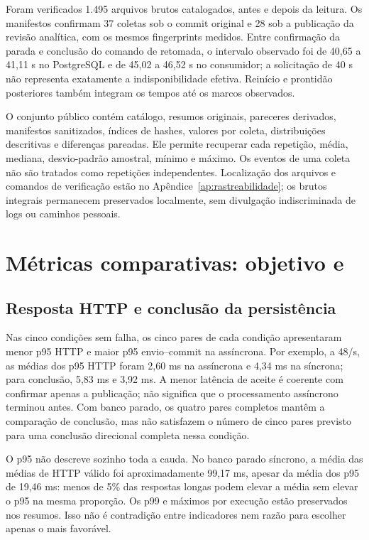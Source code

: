 Foram verificados 1.495 arquivos brutos catalogados, antes e depois da leitura. Os manifestos confirmam 37 coletas sob o commit original e 28 sob a publicação da revisão analítica, com os mesmos fingerprints medidos. Entre confirmação da parada e conclusão do comando de retomada, o intervalo observado foi de 40,65 a 41,11 s no PostgreSQL e de 45,02 a 46,52 s no consumidor; a solicitação de 40 s não representa exatamente a indisponibilidade efetiva. Reinício e prontidão posteriores também integram os tempos até os marcos observados.

O conjunto público contém catálogo, resumos originais, pareceres derivados, manifestos sanitizados, índices de hashes, valores por coleta, distribuições descritivas e diferenças pareadas. Ele permite recuperar cada repetição, média, mediana, desvio-padrão amostral, mínimo e máximo. Os eventos de uma coleta não são tratados como repetições independentes. Localização dos arquivos e comandos de verificação estão no Apêndice~\ref{ap:rastreabilidade}; os brutos integrais permanecem preservados localmente, sem divulgação indiscriminada de logs ou caminhos pessoais.



\section{Métricas comparativas: objetivo e}
\subsection{Resposta HTTP e conclusão da persistência}


Nas cinco condições sem falha, os cinco pares de cada condição apresentaram menor p95 HTTP e maior p95 envio--commit na assíncrona. Por exemplo, a 48/s, as médias dos p95 HTTP foram 2,60 ms na assíncrona e 4,34 ms na síncrona; para conclusão, 5,83 ms e 3,92 ms. A menor latência de aceite é coerente com confirmar apenas a publicação; não significa que o processamento assíncrono terminou antes. Com banco parado, os quatro pares completos mantêm a comparação de conclusão, mas não satisfazem o número de cinco pares previsto para uma conclusão direcional completa nessa condição.

O p95 não descreve sozinho toda a cauda. No banco parado síncrono, a média das médias de HTTP válido foi aproximadamente 99,17 ms, apesar da média dos p95 de 19,46 ms: menos de 5\% das respostas longas podem elevar a média sem elevar o p95 na mesma proporção. Os p99 e máximos por execução estão preservados nos resumos. Isso não é contradição entre indicadores nem razão para escolher apenas o mais favorável.


